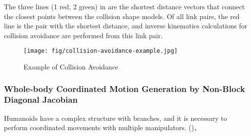 The three lines (1 red, 2 green) in  are the shortest distance vectors that connect the closest points between the collision shape models.
Of all link pairs, the red line is the pair with the shortest distance, and inverse kinematics calculations for collision avoidance are performed from this link pair.

\begin{figure}[htb]
  \begin{center}
    \texttt{[image: fig/collision-avoidance-example.jpg]}
    \caption{Example of Collision Avoidance}
  \end{center}
\end{figure}


\subsubsection{Whole-body Coordinated Motion Generation by Non-Block Diagonal Jacobian}
Humanoids have a complex structure with branches, and it is necessary to perform coordinated movements with multiple manipulators.
()．

